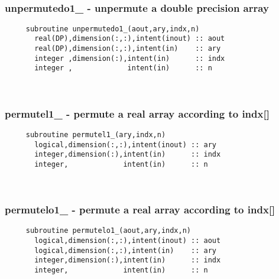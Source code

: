  
\mbox{}\hrulefill\ 
 

  \subsubsection{unpermutedo1\_ - unpermute a double precision array}

\begin{verbatim} 
     subroutine unpermutedo1_(aout,ary,indx,n)
       real(DP),dimension(:,:),intent(inout) :: aout
       real(DP),dimension(:,:),intent(in)    :: ary
       integer ,dimension(:),intent(in)      :: indx
       integer ,             intent(in)      :: n
 \end{verbatim}%
 
 
\mbox{}\hrulefill\ 
 

  \subsubsection{permutel1\_ - permute a real array according to indx[]}

\begin{verbatim} 
     subroutine permutel1_(ary,indx,n)
       logical,dimension(:,:),intent(inout) :: ary
       integer,dimension(:),intent(in)      :: indx
       integer,             intent(in)      :: n
 \end{verbatim}%
 
 
\mbox{}\hrulefill\ 
 

  \subsubsection{permutelo1\_ - permute a real array according to indx[]}

\begin{verbatim} 
     subroutine permutelo1_(aout,ary,indx,n)
       logical,dimension(:,:),intent(inout) :: aout
       logical,dimension(:,:),intent(in)    :: ary
       integer,dimension(:),intent(in)      :: indx
       integer,             intent(in)      :: n
 \end{verbatim}%
 
